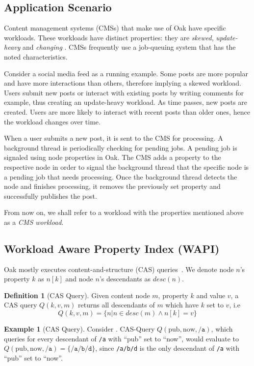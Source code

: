 \documentclass[abstracton,12pt]{scrartcl}
\theoremstyle{definition}
\newtheorem{definition}{Definition}
\newtheorem{example}{Example}
\begin{document}
\subsection{Application Scenario}
\label{sec:application_scenario}

Content management systems (CMSs) that make use of Oak have specific workloads.
These workloads have distinct properties: they are \textit{skewed},
\textit{update-heavy} and \textit{changing} \cite{KW17}. CMSs frequently use a
job-queuing system that has the noted characteristics.

Consider a social media feed as a running example. Some posts are more popular
and have more interactions than others, therefore implying a
skewed workload. Users submit new posts or interact with existing posts by
writing comments for example, thus creating an update-heavy workload. As time
passes, new posts are created. Users are more likely to interact with recent
posts than older ones, hence the workload changes over time.

When a user submits a new post, it is sent to the CMS for processing. A
background thread is periodically checking for pending jobs. A pending job is
signaled using node properties in Oak.
The CMS adds a property to the respective node  in
order to signal the background thread that the specific node is a pending job that needs
processing. Once the
background thread detects the node and finishes processing, it removes the
previously set property and
successfully publishes the post.

From now on, we shall refer to a workload with the properties mentioned above as
a \textit{CMS workload}.

\subsection{Workload Aware Property Index (WAPI)}
\label{sec:wapi}

Oak mostly executes content-and-structure (CAS) queries~\cite{CM15}.
We denote node $n$'s property $k$ as $n[k]$ and node $n$'s descendants as
$desc(n)$.

\begin{definition}[CAS Query]
  Given content node $m$, property $k$ and value $v$, a CAS query
  $Q(k,v,m)$ returns all descendants of $m$ which have $k$ set to $v$, i.e
  $$ Q(k,v,m) = \{ n | n \in desc(m) \land n[k] = v\} $$
\end{definition}

\begin{example}[CAS Query]
  Consider . CAS-Query $Q(\text{pub},\text{now},\texttt{/a})$,
  which queries for every descendant of \texttt{/a} with
  ``pub'' set to ``now'', would evaluate to $Q(\text{pub},\text{now},\texttt{/a}) = \{\texttt{/a/b/d}\}$,
  since \texttt{/a/b/d} is the only descendant of \texttt{/a} with ``pub'' set
  to ``now''.
  \label{ex:cas_query}
\end{example}
\end{document}
